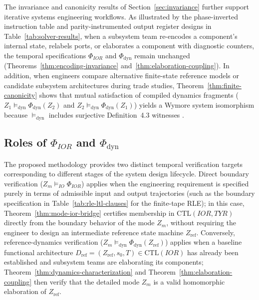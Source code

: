 The invariance and canonicity results of Section~\ref{sec:invariance} further support iterative systems engineering workflows. As illustrated by the phase-inverted instruction table and parity-instrumented output register designs in Table~\ref{tab:solver-results}, when a subsystem team re-encodes a component's internal state, relabels ports, or elaborates a component with diagnostic counters, the temporal specifications $\Phi_{IOR}$ and $\Phi_{\mathrm{dyn}}$ remain unchanged (Theorems~\ref{thm:encoding-invariance} and~\ref{thm:elaboration-coupling}). In addition, when engineers compare alternative finite-state reference models or candidate subsystem architectures during trade studies, Theorem~\ref{thm:finite-canonicity} shows that mutual satisfaction of compiled dynamics fragments ($Z_1\models_{\mathrm{dyn}}\Phi_{\mathrm{dyn}}(Z_2)$ and $Z_2\models_{\mathrm{dyn}}\Phi_{\mathrm{dyn}}(Z_1)$) yields a Wymore system isomorphism because $\models_{\mathrm{dyn}}$ includes surjective Definition~4.3 witnesses \citep{Wymore1993}.

\subsection{Roles of \texorpdfstring{$\Phi_{IOR}$ and $\Phi_{\mathrm{dyn}}$}{Phi\_IOR and Phi\_dyn}}
\label{sec:complementary-roles}

The proposed methodology provides two distinct temporal verification targets corresponding to different stages of the system design lifecycle. Direct boundary verification ($Z_m\models_{IO}\Phi_{IOR}$) applies when the engineering requirement is specified purely in terms of admissible input and output trajectories (such as the boundary specification in Table~\ref{tab:rle-ltl-clauses} for the finite-tape RLE); in this case, Theorem~\ref{thm:mode-ior-bridge} certifies membership in $\mathrm{CTL}(IOR,TYR)$ directly from the boundary behavior of the mode $Z_m$, without requiring the engineer to design an intermediate reference state machine $Z_{\mathrm{ref}}$. Conversely, reference-dynamics verification ($Z_m\models_{\mathrm{dyn}}\Phi_{\mathrm{dyn}}(Z_{\mathrm{ref}})$) applies when a baseline functional architecture $D_{\mathrm{ref}}=(Z_{\mathrm{ref}},s_0,T)\in\mathrm{CTL}(IOR)$ has already been established and subsystem teams are elaborating its components; Theorem~\ref{thm:dynamics-characterization} and Theorem~\ref{thm:elaboration-coupling} then verify that the detailed mode $Z_m$ is a valid homomorphic elaboration of $Z_{\mathrm{ref}}$.

